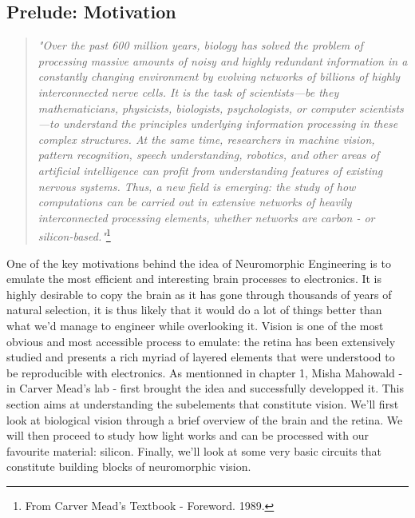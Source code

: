 \subsection{Prelude: Motivation}

\begin{quote}
    \textit{"Over the past 600 million years, biology has solved the problem of processing massive amounts of noisy and highly redundant information in a constantly changing environment by evolving networks of billions of highly interconnected nerve cells. It is the task of scientists—be they mathematicians, physicists, biologists, psychologists, or computer scientists—to understand the principles underlying information processing in these complex structures. At the same time, researchers in machine vision, pattern recognition, speech understanding, robotics, and other areas of artificial intelligence can profit from understanding features of existing nervous systems. Thus, a new field is emerging: the study of how computations can be carried out in extensive networks of heavily interconnected processing elements, whether networks are carbon - or silicon-based."}\footnote{From Carver Mead's Textbook - Foreword. 1989.}
\end{quote}

One of the key motivations behind the idea of Neuromorphic Engineering is to emulate the most efficient and interesting brain processes to electronics. It is highly desirable to copy the brain as it has gone through thousands of years of natural selection, it is thus likely that it would do a lot of things better than what we'd manage to engineer while overlooking it. Vision is one of the most obvious and most accessible process to emulate: the retina has been extensively studied and presents a rich myriad of layered elements that were understood to be reproducible with electronics. As mentionned in chapter 1, Misha Mahowald - in Carver Mead's lab - first brought the idea and successfully developped it. This section aims at understanding the subelements that constitute vision. We'll first look at biological vision through a brief overview of the brain and the retina. We will then proceed to study how light works and can be processed with our favourite material: silicon. Finally, we'll look at some very basic circuits that constitute building blocks of neuromorphic vision.   

